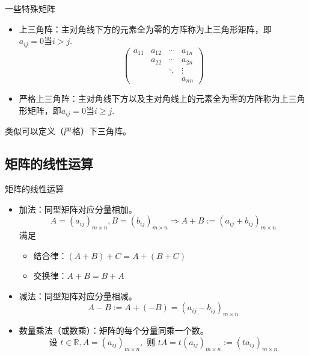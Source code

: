 
\begin{frame}{一些特殊矩阵}

\begin{itemize}
\item 上三角阵：主对角线下方的元素全为零的方阵称为上三角形矩阵，即$a_{ij} = 0 \text{当$i > j$.}$
\[\begin{pmatrix}
a_{11} & a_{12} & \cdots & a_{1n} \\ & a_{22} & \cdots & a_{2n} \\ & & \ddots & \vdots \\ & & & a_{nn}
\end{pmatrix}\]

\item 严格上三角阵：主对角线下方以及主对角线上的元素全为零的方阵称为上三角形矩阵，即$a_{ij} = 0 \text{当$i \geqslant j$.}$
\end{itemize}
类似可以定义（严格）下三角阵。

\end{frame}


\subsection{矩阵的线性运算}


\begin{frame}{矩阵的线性运算}

\begin{itemize}
\item 加法：同型矩阵对应分量相加。
\[A = (a_{ij})_{m\times n}, B = (b_{ij})_{m\times n} \Rightarrow A + B := (a_{ij} + b_{ij})_{m\times n}\]
满足
\begin{itemize}
\item[$\bullet$] 结合律：$(A+B)+C = A+(B+C)$
\item[$\bullet$] 交换律：$A+B = B+A$
\end{itemize}
\item 减法：同型矩阵对应分量相减。
\[A - B := A + (-B) = (a_{ij} - b_{ij})_{m\times n}\]
\item 数量乘法（或数乘）：矩阵的每个分量同乘一个数。
\[\text{设 }t\in\mathbb{R}, A = (a_{ij})_{m\times n}, \text{ 则  } tA = t(a_{ij})_{m\times n} := (ta_{ij})_{m\times n}\]
\end{itemize}

\end{frame}

